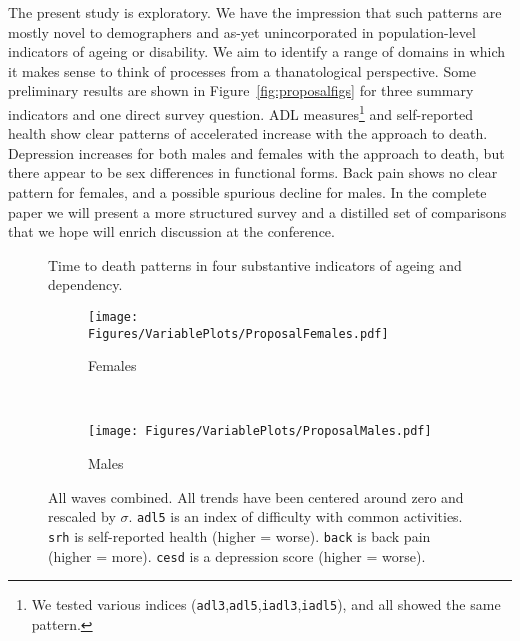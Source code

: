 \documentclass{article}
\begin{document}
The present study is exploratory. We have the impression
that such patterns are mostly novel to demographers and as-yet unincorporated in
population-level indicators of ageing or disability. We aim to identify a
range of domains in which it makes sense to think of processes from a
thanatological perspective. Some preliminary results are shown in
Figure~\ref{fig:proposalfigs} for three summary indicators and one direct survey
question. ADL measures\footnote{We tested various indices
(\texttt{adl3},\texttt{adl5},\texttt{iadl3},\texttt{iadl5}), and all showed the
same pattern.} and self-reported health show clear patterns of
accelerated increase with the approach to death. Depression increases for both
males and females with the approach to death, but there appear to be sex
differences in functional forms. Back pain shows no clear pattern for females,
and a possible spurious decline for males. In the complete paper we will present a
more structured survey and a distilled set of comparisons that we hope will
enrich discussion at the conference. 

\begin{figure}
\centering
\caption{Time to death patterns in four substantive indicators of ageing and
dependency.}
\label{fig:proposalfigs}
\begin{subfigure}[b]{.47\linewidth}
\centering
	\caption{Females}
	\label{fig:females}
	\texttt{[image: Figures/VariablePlots/ProposalFemales.pdf]}	
\end{subfigure}
~
\begin{subfigure}[b]{.47\linewidth}
\centering
    \caption{Males}
	\label{fig:ales}
    \texttt{[image: Figures/VariablePlots/ProposalMales.pdf]}
\end{subfigure}
\caption{All waves combined. All trends have been centered around zero and
rescaled by $\sigma$. \texttt{adl5} is an index of difficulty with common
activities. \texttt{srh} is self-reported health (higher = worse).
\texttt{back} is back pain (higher = more). \texttt{cesd} is a depression score
(higher = worse).}
\end{figure}




   
  
\end{document}
